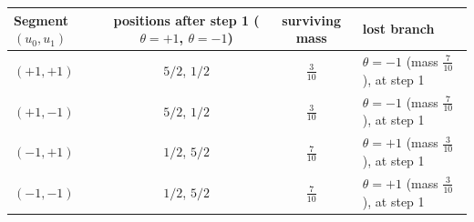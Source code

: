 \begin{tabular}{@{}l c c l@{}}
\toprule
Segment $(u_0,u_1)$ & positions after step 1 ($\theta=+1$, $\theta=-1$) & surviving mass & lost branch\\
\midrule
$(+1,+1)$ & $5/2$, $1/2$ & $\tfrac{3}{10}$ & $\theta=-1$ (mass $\tfrac{7}{10}$), at step 1\\
$(+1,-1)$ & $5/2$, $1/2$ & $\tfrac{3}{10}$ & $\theta=-1$ (mass $\tfrac{7}{10}$), at step 1\\
$(-1,+1)$ & $1/2$, $5/2$ & $\tfrac{7}{10}$ & $\theta=+1$ (mass $\tfrac{3}{10}$), at step 1\\
$(-1,-1)$ & $1/2$, $5/2$ & $\tfrac{7}{10}$ & $\theta=+1$ (mass $\tfrac{3}{10}$), at step 1\\
\bottomrule
\end{tabular}
